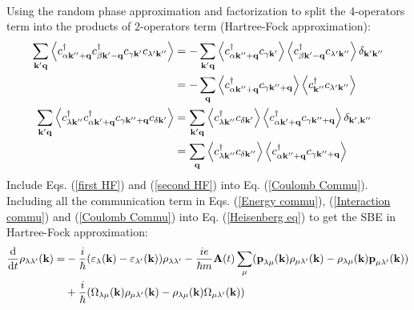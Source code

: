 \documentclass[12pt,english,a4paper]{article}
\newcommand{\dg}{\dagger}
\begin{document}
\begin{appendices}
\begin{align}
\end{align}
\quad Using the random phase approximation and factorization to split the 4-operators term into the products of 2-operators term (Hartree-Fock approximation):
\begin{align}
	\sum_{\textbf{k}'\textbf{q}}\ev{c^\dg_{\alpha \textbf{k}''+\textbf{q}} c^\dg_{\beta \textbf{k}'-\textbf{q}} c_{\gamma \textbf{k}'} c_{\lambda' \textbf{k}''}} &= 	-\sum_{\textbf{k}'\textbf{q}} \ev{c^\dg_{\alpha \textbf{k}''+\textbf{q}}c_{\gamma\textbf{k}'}}\ev{c_{\beta \textbf{k}'-\textbf{q}}^\dg c_{\lambda' \textbf{k}''}} \delta_{\textbf{k}'\textbf{k}''}\nonumber\\\label{first HF}
	&= - \sum_{\textbf{q}}\ev{c^\dg_{\alpha \textbf{k}''+\textbf{q}} c_{\gamma \textbf{k}''+\textbf{q}}}\ev{c^\dg_{\textbf{k}''}c_{\lambda'\textbf{k}''}}\\
	\sum_{\textbf{k}'\textbf{q}} \ev{c^\dg_{\lambda \textbf{k}''} c^\dg_{\alpha \textbf{k}'+\textbf{q}}c_{\gamma \textbf{k}''+\textbf{q}}c_{\delta\textbf{k}'}} &= \sum_{\textbf{k}'\textbf{q}}\ev{c_{\lambda\textbf{k}''}^\dg c_{\delta\textbf{k}'}}\ev{c^\dg_{\alpha \textbf{k}'+\textbf{q}} c_{\gamma \textbf{k}''+\textbf{q}}}\delta_{\textbf{k}',\textbf{k}''}\nonumber \\\label{second HF}
	&= \sum_{\textbf{q}}\ev{c_{\lambda\textbf{k}''}^\dg c_{\delta\textbf{k}''}}\ev{c^\dg_{\alpha \textbf{k}''+\textbf{q}} c_{\gamma \textbf{k}''+\textbf{q}}}
\end{align}
\quad Include Eqs. (\ref{first HF}) and (\ref{second HF}) into Eq. (\ref{Coulomb Commu}).
Including all the communication term in Eqs. (\ref{Energy commu}), (\ref{Interaction commu}) and (\ref{Coulomb Commu}) into Eq. (\ref{Heisenberg eq}) to get the SBE in Hartree-Fock approximation:
\begin{align}
	\dv{ }{t}\rho_{\lambda\lambda'}(\textbf{k}) = &- \frac{i}{\hbar} (\varepsilon_\lambda(\textbf{k}) - \varepsilon_{\lambda'} (\textbf{k}))\rho_{\lambda \lambda'} - \frac{ie}{\hbar m} \textbf{A}(t)\sum_{\mu}(\textbf{p}_{\lambda\mu}(\textbf{k})\rho_{\mu \lambda'}(\textbf{k}) - \rho_{\lambda\mu}(\textbf{k})\textbf{p}_{\mu \lambda'}(\textbf{k})) \nonumber \\
	&+ \frac{i}{\hbar}(\Omega_{\lambda \mu}(\textbf{k})\rho_{\mu \lambda'}(\textbf{k}) - \rho_{\lambda\mu}(\textbf{k}) \Omega_{\mu \lambda'} (\textbf{k}))
\end{align}

\end{appendices}
\end{document}
